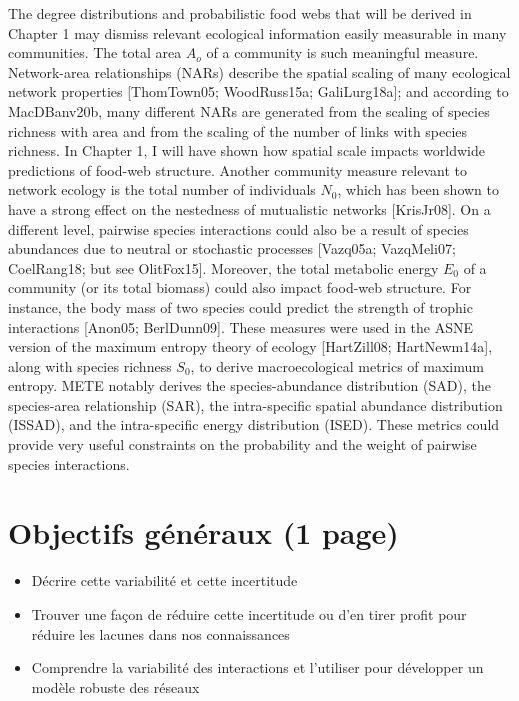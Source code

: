 The degree distributions and probabilistic food webs that will be derived in
Chapter 1 may dismiss relevant ecological information easily measurable in many
communities. The total area $A_o$ of a community is such meaningful measure.
Network-area relationships (NARs) describe the spatial scaling of many
ecological network properties [ThomTown05; WoodRuss15a; GaliLurg18a]; and
according to MacDBanv20b, many different NARs are generated from the scaling of
species richness with area and from the scaling of the number of links with
species richness. In Chapter 1, I will have shown how spatial scale impacts
worldwide predictions of food-web structure. Another community measure relevant
to network ecology is the total number of individuals $N_0$, which has been
shown to have a strong effect on the nestedness of mutualistic networks
[KrisJr08]. On a different level, pairwise species interactions could also be a
result of species abundances due to neutral or stochastic processes [Vazq05a;
VazqMeli07; CoelRang18; but see OlitFox15]. Moreover, the total metabolic
energy $E_0$ of a community (or its total biomass) could also impact food-web
structure. For instance, the body mass of two species could predict the strength
of trophic interactions [Anon05; BerlDunn09]. These measures were used in the
ASNE version of the maximum entropy theory of ecology [HartZill08;
HartNewm14a], along with species richness $S_0$, to derive macroecological
metrics of maximum entropy. METE notably derives the species-abundance
distribution (SAD), the species-area relationship (SAR), the intra-specific
spatial abundance distribution (ISSAD), and the intra-specific energy
distribution (ISED). These metrics could provide very useful constraints on the
probability and the weight of pairwise species interactions.


\section{Objectifs généraux (1 page)} 

\begin{itemize}
    \item Décrire cette variabilité et cette incertitude
    \item Trouver une façon de réduire cette incertitude ou d'en tirer profit pour réduire les lacunes dans nos connaissances
    \item Comprendre la variabilité des interactions et l'utiliser pour développer un modèle robuste des réseaux
\end{itemize}

